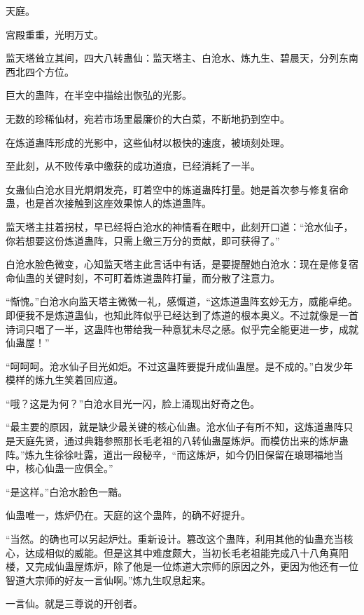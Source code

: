 
\begin{this_body}

天庭。

宫殿重重，光明万丈。

监天塔耸立其间，四大八转蛊仙：监天塔主、白沧水、炼九生、碧晨天，分列东南西北四个方位。

巨大的蛊阵，在半空中描绘出恢弘的光影。

无数的珍稀仙材，宛若市场里最廉价的大白菜，不断地扔到空中。

在炼道蛊阵形成的光影中，这些仙材以极快的速度，被顷刻处理。

至此刻，从不败传承中缴获的成功道痕，已经消耗了一半。

女蛊仙白沧水目光炯炯发亮，盯着空中的炼道蛊阵打量。她是首次参与修复宿命蛊，也是首次接触到这座效果惊人的炼道蛊阵。

监天塔主拄着拐杖，早已经将白沧水的神情看在眼中，此刻开口道：“沧水仙子，你若想要这份炼道蛊阵，只需上缴三万分的贡献，即可获得了。”

白沧水脸色微变，心知监天塔主此言话中有话，是要提醒她白沧水：现在是修复宿命仙蛊的关键时刻，不可盯着炼道蛊阵打量，而分散了注意力。

“惭愧。”白沧水向监天塔主微微一礼，感慨道，“这炼道蛊阵玄妙无方，威能卓绝。即便我不是炼道蛊仙，也知此阵似乎已经达到了炼道的根本奥义。不过就像是一首诗词只唱了一半，这蛊阵也带给我一种意犹未尽之感。似乎完全能更进一步，成就仙蛊屋！”

“呵呵呵。沧水仙子目光如炬。不过这蛊阵要提升成仙蛊屋。是不成的。”白发少年模样的炼九生笑着回应道。

“哦？这是为何？”白沧水目光一闪，脸上涌现出好奇之色。

“最主要的原因，就是缺少最关键的核心仙蛊。沧水仙子有所不知，这炼道蛊阵只是天庭先贤，通过典籍参照那长毛老祖的八转仙蛊屋炼炉。而模仿出来的炼炉蛊阵。”炼九生徐徐吐露，道出一段秘辛，“而这炼炉，如今仍旧保留在琅琊福地当中，核心仙蛊一应俱全。”

“是这样。”白沧水脸色一黯。

仙蛊唯一，炼炉仍在。天庭的这个蛊阵，的确不好提升。

“当然。的确也可以另起炉灶。重新设计。篡改这个蛊阵，利用其他的仙蛊充当核心，达成相似的威能。但是这其中难度颇大，当初长毛老祖能完成八十八角真阳楼，又完成仙蛊屋炼炉，除了他是一位炼道大宗师的原因之外，更因为他还有一位智道大宗师的好友一言仙啊。”炼九生叹息起来。

一言仙。就是三尊说的开创者。


\end{this_body}
